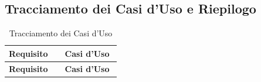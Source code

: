 \documentclass[a4paper,12pt]{article}
\begin{document}
{        \subsection{Tracciamento dei Casi d’Uso e Riepilogo} {
            \begin{longtable}{| >{\centering\arraybackslash}p{0.47\linewidth} | >{\centering\arraybackslash}p{0.47\linewidth} |}
                \caption{Tracciamento dei Casi d’Uso} \\
                
                \hline
                \rowcolor{lightgray}
                \textbf{Requisito} & \textbf{Casi d'Uso} \\
                \hline
                \endfirsthead
                
                \hline
                \rowcolor{lightgray}
                \textbf{Requisito} & \textbf{Casi d'Uso} \\
                \hline
                \endhead
                

\end{longtable}}}
\end{document}
